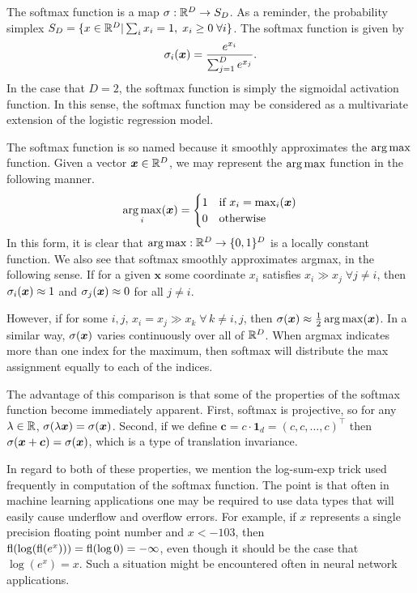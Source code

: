 \label{softmax}

The softmax function is a map \(\sigma:\mathbb R^D \rightarrow S_D\). As a reminder, the probability simplex
 \(S_D = \{x\in\mathbb R^D|\sum_i x_i = 1, \; x_i\geq 0 \; \forall i\}\). The softmax function is given by
 \begin{equation}\label{eqn:softmaxDef}
 \sigma_i(\bm x) = \frac{e^{x_i}}{\sum_{j=1}^{D} e^{x_j}}.
 \end{equation}
 In the case that \(D=2\), the softmax function is simply the sigmoidal 
 activation function. In this sense, the softmax function may be considered as
 a multivariate extension of the logistic regression model.

 The softmax function is so named because it smoothly approximates the 
 \(\operatorname*{arg\,max}\) function.   Given a vector \(\bm x\in \mathbb R^{D}\), we may 
 represent the \(\operatorname*{arg\,max}\) function in the following manner.
 \begin{equation*}
	 \operatorname*{arg\,max}_i(\bm x) = 
	 \begin{cases}
	 	1 & \text{if } x_i = \max_i(\bm x)\\
	 	0 & \text{otherwise}
	 \end{cases}
 \end{equation*}
 In this form, it is clear that \(\operatorname*{arg\,max}:\mathbb R^D\rightarrow \{0,1\}^{D}\) is 
 a locally constant function.  We also see that softmax smoothly approximates argmax, in the following sense.  If for a given  \(\bm x\) some coordinate \(x_i\) satisfies \(x_i\gg x_j\;\forall j\neq i\),  then \(\sigma_i(\bm x) \approx 1\) and \( \sigma_j(\bm x)\approx 0 \) for all \( j\neq i \).

 However, if for some \(i,j\), \(x_i=x_j\gg x_k\;\forall\, k\neq i,j\), then 
 \(\sigma(\bm x) \approx \frac 12 \operatorname*{arg\,max}(\bm x)\).  In a similar way, 
 \(\sigma(\bm x)\) varies continuously over all of \(\mathbb R^D\). When argmax 
 indicates more than one index for the maximum, then softmax will distribute 
 the max assignment equally to each of the indices.

 The advantage of this comparison is that some of the properties of the 
 softmax function become immediately apparent.  First, softmax is projective, 
 so for any \(\lambda \in\mathbb R\), \(\sigma(\lambda\bm x) = \sigma(\bm x)\). Second, if we define 
 \(\bm c = c\cdot \bm 1_d = (c,c,\ldots,c)^{\intercal}\) then 
 \(\sigma(\bm x+\bm c)=\sigma(\bm x)\), which is a type of translation invariance.

 In regard to both of these properties, we mention the log-sum-exp trick used 
 frequently in computation of the softmax function. The point is that often in 
 machine learning applications one may be required to use data types that 
 will easily cause underflow and overflow errors.  For example, if \(x\) 
 represents a single precision floating point number and \(x<-103\), then 
 \(\operatorname{fl}(\log(\operatorname{fl}(e^x))) = \operatorname{fl}(\log 0) = -\infty\), even though it 
 should be the case that \(\log(e^x) = x\). Such a situation might be 
 encountered often in neural network applications.

